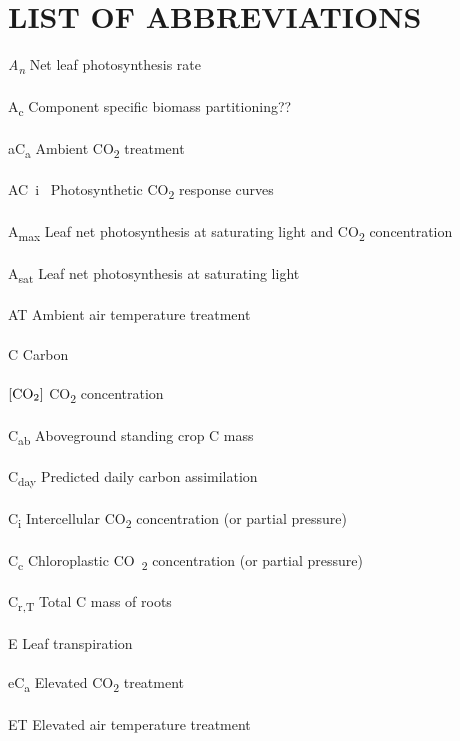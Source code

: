 \documentclass[a4paper]{article}
\begin{document}
\section*{LIST OF ABBREVIATIONS}

\textit{A\textsubscript{n}}  Net leaf photosynthesis rate
\\
\\
A\textsubscript{c} Component specific biomass partitioning??
\\
\\
aC\textsubscript{a} Ambient CO\textsubscript{2} treatment
\\
\\
AC~i~ Photosynthetic CO\textsubscript{2} response curves 
\\
\\
A\textsubscript{max} Leaf net photosynthesis at saturating light and CO\textsubscript{2} concentration
\\
\\
A\textsubscript{sat} Leaf net photosynthesis at saturating light
\\
\\
AT  Ambient air temperature treatment
\\
\\
C Carbon
\\
\\
$[\textrm{CO\textsubscript{2}}]$ CO\textsubscript{2} concentration
\\
\\
C\textsubscript{ab} Aboveground standing crop C mass
\\
\\
C\textsubscript{day} Predicted daily carbon assimilation
\\
\\
C\textsubscript{i} Intercellular CO\textsubscript{2} concentration (or partial pressure)
\\
\\
C\textsubscript{c} Chloroplastic CO~\textsubscript{2} concentration (or partial pressure)
\\
\\
C\textsubscript{r,T}  Total C mass of roots
\\
\\
E Leaf transpiration
\\
\\
eC\textsubscript{a} Elevated CO\textsubscript{2} treatment
\\
\\
ET  Elevated air temperature treatment
\\
\end{document}
